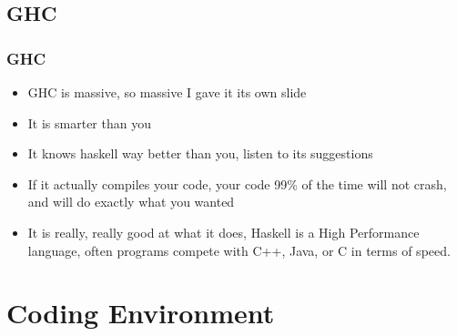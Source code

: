\subsection{GHC}
\begin{frame}[t,fragile]
    \frametitle{GHC}
    \begin{itemize}[<+->]
        \item GHC is massive, so massive I gave it its own slide

        \item It is smarter than you

        \item It knows haskell way better than you, listen to its suggestions

        \item If it actually compiles your code, your code 99\% of the time will not crash,
            and will do exactly what you wanted

        \item It is really, really good at what it does, Haskell is a High Performance language,
            often programs compete with C++, Java, or C in terms of speed.
    \end{itemize}
\end{frame}

\section{Coding Environment}
